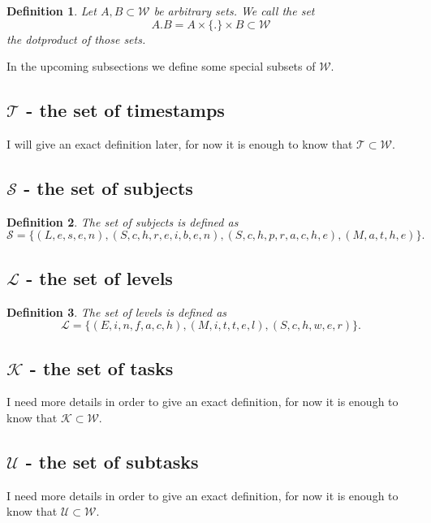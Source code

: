 \documentclass{scrartcl}
\newtheorem{mydef}{Definition}
\begin{document}
\begin{mydef}
Let $A,B\subset\mathcal{W}$ be arbitrary sets. We call the set 
$$A.B=A\times\{.\}\times B\subset\mathcal{W}$$
the \emph{dotproduct} of those sets.
\end{mydef}

In the upcoming subsections we define some special subsets of $\mathcal{W}$.


\subsection{$\mathcal{T}$ - the set of timestamps}
I will give an exact definition later, for now it is enough to know that $\mathcal{T}\subset\mathcal{W}$.
\subsection{$\mathcal{S}$ - the set of subjects}
\begin{mydef}
The \emph{set of subjects} is defined as
\begin{equation}
\mathcal{S}=\{(L,e,s,e,n),(S,c,h,r,e,i,b,e,n),(S,c,h,p,r,a,c,h,e),(M,a,t,h,e)\}.
\end{equation}
\end{mydef}

\subsection{$\mathcal{L}$ - the set of levels}
\begin{mydef}
The \emph{set of levels} is defined as
\begin{equation}
\mathcal{L}=\{(E,i,n,f,a,c,h),(M,i,t,t,e,l),(S,c,h,w,e,r)\}.
\end{equation}
\end{mydef}

\subsection{$\mathcal{K}$ - the set of tasks}
I need more details in order to give an exact definition, for now it is enough to know that $\mathcal{K}\subset\mathcal{W}$.

\subsection{$\mathcal{U}$ - the set of subtasks}
I need more details in order to give an exact definition, for now it is enough to know that $\mathcal{U}\subset\mathcal{W}$.
\end{document}
